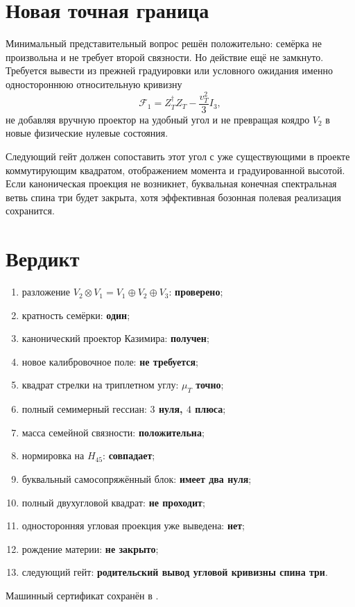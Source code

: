\section{Новая точная граница}

Минимальный представительный вопрос решён положительно: семёрка не
произвольна и не требует второй связности. Но действие ещё не замкнуто.
Требуется вывести из прежней градуировки или условного ожидания именно
одностороннюю относительную кривизну
\begin{equation}
 \mathcal F_1=Z_T^\dagger Z_T-\frac{v_T^2}{3}I_3,
\end{equation}
не добавляя вручную проектор на удобный угол и не превращая коядро
$V_2$ в новые физические нулевые состояния.

Следующий гейт должен сопоставить этот угол с уже существующими в проекте
коммутирующим квадратом, отображением момента и градуированной высотой.
Если каноническая проекция не возникнет, буквальная конечная
спектральная ветвь спина три будет закрыта, хотя эффективная бозонная
полевая реализация сохранится.

\section{Вердикт}

\begin{protocol}
\begin{enumerate}
 \item разложение $V_2\otimes V_1=V_1\oplus V_2\oplus V_3$:
 \textbf{проверено};
 \item кратность семёрки: \textbf{один};
 \item канонический проектор Казимира: \textbf{получен};
 \item новое калибровочное поле: \textbf{не требуется};
 \item квадрат стрелки на триплетном углу: \textbf{$\mu_T$ точно};
 \item полный семимерный гессиан: \textbf{$3$ нуля, $4$ плюса};
 \item масса семейной связности: \textbf{положительна};
 \item нормировка на $H_{45}$: \textbf{совпадает};
 \item буквальный самосопряжённый блок: \textbf{имеет два нуля};
 \item полный двухугловой квадрат: \textbf{не проходит};
 \item односторонняя угловая проекция уже выведена: \textbf{нет};
 \item рождение материи: \textbf{не закрыто};
 \item следующий гейт: \textbf{родительский вывод угловой кривизны
 спина три}.
\end{enumerate}
\end{protocol}

Машинный сертификат сохранён в
.